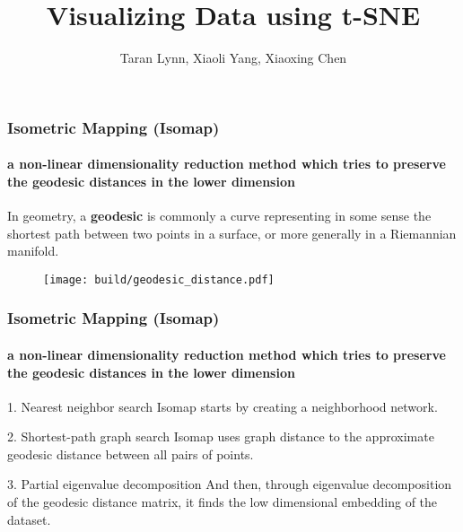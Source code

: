 \documentclass{beamer}
\title{Visualizing Data using t-SNE}
\author{Taran Lynn, Xiaoli Yang, Xiaoxing Chen}
\begin{document}
\maketitle

% 
% 
% 
%

\begin{frame}
  \frametitle{Isometric Mapping (Isomap)}
  \framesubtitle{a non-linear dimensionality reduction method which tries to preserve the geodesic distances in the lower dimension}

  In geometry, a \textbf{geodesic} is commonly a curve representing in some sense the shortest path 
  between two points in a surface, or more generally in a Riemannian manifold.
  \begin{figure}
    \centering
    \texttt{[image: build/geodesic\_distance.pdf]}
  \end{figure}

\end{frame}

\begin{frame}
  \frametitle{Isometric Mapping (Isomap)}
  \framesubtitle{a non-linear dimensionality reduction method which tries to preserve the geodesic distances in the lower dimension}

  \begin{block}{1. Nearest neighbor search}
    Isomap starts by creating a neighborhood network.
  \end{block}

  \begin{block}{2. Shortest-path graph search}
    Isomap uses graph distance to the approximate geodesic distance between all pairs of points.
  \end{block}

  \begin{block}{3. Partial eigenvalue decomposition}
    And then, through eigenvalue decomposition of the geodesic distance matrix, it finds the low dimensional embedding of the dataset.
  \end{block}
  

\end{frame}
\end{document}

